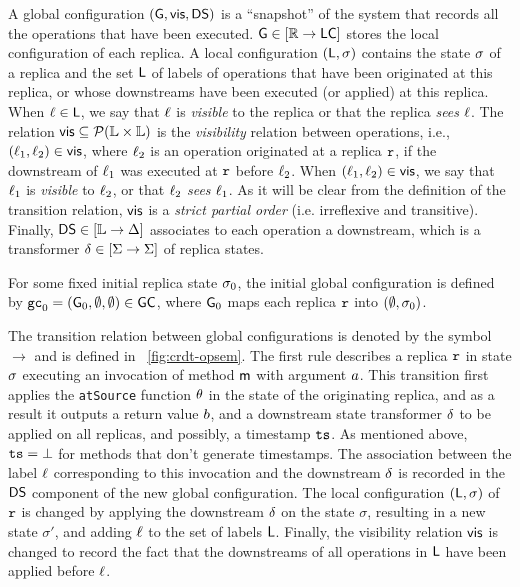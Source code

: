 A global configuration $(\mathsf{G}, \mathsf{vis}, \mathsf{DS})$ is a
``snapshot'' of the system that records all the operations that have
been executed.
$\mathsf{G} \in [\mathbb{R} \rightarrow \mathsf{LC}]$ stores the local
configuration of each replica.
A local configuration $(\mathsf{L}, \sigma)$ contains the state
$\sigma$ of a replica and the set $\mathsf{L}$ of labels of
operations that have been originated at this replica, or whose
downstreams have been executed (or applied) at this replica.
When $\ell\in \mathsf{L}$, we say that $\ell$ is \emph{visible}
to the replica or that the replica \emph{sees} $\ell$.
The relation $\mathsf{vis}\subseteq \mathcal{P}(\mathbb{L} \times \mathbb{L})$ is
the \emph{visibility} relation between operations, i.e.,
$(\ell_1,\ell_2)\in \mathsf{vis}$, where $\ell_2$ is an operation
originated at a replica $\mathtt{r}$, if the downstream of $\ell_1$ was
executed at $\mathtt{r}$ before $\ell_2$.
When $(\ell_1,\ell_2)\in \mathsf{vis}$, we say that $\ell_1$ is
\emph{visible} to $\ell_2$, or that $\ell_2$ \emph{sees}
$\ell_1$.
As it will be clear from the definition of the transition relation,
$\mathsf{vis}$ is a \emph{strict partial order} (i.e. irreflexive and transitive).
Finally, $\mathsf{DS}\in [\mathbb{L} \rightarrow \Delta]$ associates to
each operation a downstream, which is a transformer $\delta\in
[\Sigma \rightarrow \Sigma]$ of replica states.

For some fixed initial replica state $\sigma_0$, the initial global configuration is defined by $\mathtt{gc}_0 = (\mathsf{G}_0, \emptyset, \emptyset) \in \mathsf{GC}$, where $\mathsf{G}_0$ maps each replica $\mathtt{r}$ into $(\emptyset, \sigma_0)$.


The transition relation between global configurations is denoted by
the symbol $\rightarrow$ and is defined in
\figurename~\ref{fig:crdt-opsem}.
The first rule describes a replica $\mathtt{r}$ in state $\sigma$
executing an invocation of method $\mathsf{m}$ with argument $a$.
This transition first applies the {\tt atSource} function $\theta$
in the state of the originating replica, and as a result it outputs a
return value $b$, and a downstream state transformer $\delta$
to be applied on all replicas, and possibly, a timestamp $\mathtt{ts}$.
As mentioned above, $\mathtt{ts}=\bot$ for methods that don't generate
timestamps.
The association between the label $\ell$ corresponding to this
invocation and the downstream $\delta$ is recorded in the
$\mathsf{DS}$ component of the new global configuration.
The local configuration $(\mathsf{L},\sigma)$ of $\mathtt{r}$ is changed by
applying the downstream $\delta$ on the state $\sigma$, resulting
in a new state $\sigma'$, and adding $\ell$ to the set of labels
$\mathsf{L}$.
Finally, the visibility relation $\mathsf{vis}$ is changed to record the
fact that the downstreams of all operations in $\mathsf{L}$ have been
applied before $\ell$.

